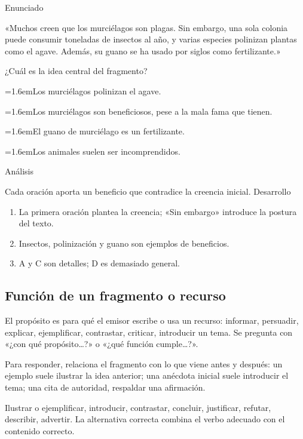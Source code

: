 \documentclass[10pt,a4paper,twocolumn]{article}
\newcommand{\alternativa}[2]{\par\noindent\hangindent=1.6em\hangafter=1\makebox[1.6em][l]{\tecla{#1}}#2\par}
\newcommand{\clave}[1]{\par\smallskip{\sffamily\footnotesize\color{esmeralda} Clave \teclaok{#1}}\par}
\begin{document}
\begin{ejemplo}
{\sffamily\footnotesize\color{zinc500} Enunciado}\par
«Muchos creen que los murciélagos son plagas. Sin embargo, una sola colonia puede consumir toneladas de insectos al año, y varias especies polinizan plantas como el agave. Además, su guano se ha usado por siglos como fertilizante.»

¿Cuál es la idea central del fragmento?
\alternativa{A}{Los murciélagos polinizan el agave.}
\alternativa{B}{Los murciélagos son beneficiosos, pese a la mala fama que tienen.}
\alternativa{C}{El guano de murciélago es un fertilizante.}
\alternativa{D}{Los animales suelen ser incomprendidos.}
\clave{B}
{\sffamily\footnotesize\color{zinc500} Análisis}\par Cada oración aporta un beneficio que contradice la creencia inicial.
{\sffamily\footnotesize\color{zinc500} Desarrollo}
\begin{enumerate}
  \item La primera oración plantea la creencia; «Sin embargo» introduce la postura del texto.
  \item Insectos, polinización y guano son ejemplos de beneficios.
  \item A y C son detalles; D es demasiado general.
\end{enumerate}
\end{ejemplo}

\subsection{Función de un fragmento o recurso}

El propósito es para qué el emisor escribe o usa un recurso: informar, persuadir, explicar, ejemplificar, contrastar, criticar, introducir un tema. Se pregunta con «¿con qué propósito\ldots{}?» o «¿qué función cumple\ldots{}?».

Para responder, relaciona el fragmento con lo que viene antes y después: un ejemplo suele ilustrar la idea anterior; una anécdota inicial suele introducir el tema; una cita de autoridad, respaldar una afirmación.

\begin{definicion}
Ilustrar o ejemplificar, introducir, contrastar, concluir, justificar, refutar, describir, advertir. La alternativa correcta combina el verbo adecuado con el contenido correcto.
\end{definicion}
\end{document}
